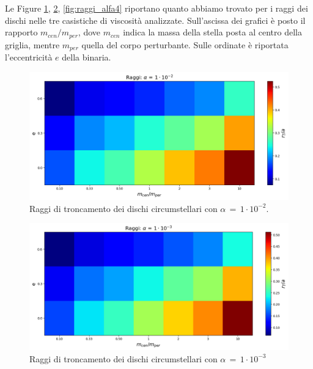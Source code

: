 Le Figure \ref{fig:raggi_alfa2}, \ref{fig:raggi_alfa3}, \ref{fig:raggi_alfa4} riportano quanto abbiamo trovato per i raggi dei dischi nelle tre casistiche di viscosità analizzate. Sull'ascissa dei grafici è posto il rapporto $m_{cen}/m_{per}$, dove $m_{cen}$ indica la massa della stella posta al centro della griglia, mentre $m_{per}$ quella del corpo perturbante. Sulle ordinate è riportata l'eccentricità $e$ della binaria. 

\begin{figure}[H]
  \centering
  \includegraphics[width=\textwidth]{Immagini/Risultati/raggi_alfa2.png}
  \caption{Raggi di troncamento dei dischi circumstellari con $\alpha\,=\,1 \cdot 10^{-2}$. }
  \label{fig:raggi_alfa2}
\end{figure}

\begin{figure}[H]
  \centering
  \includegraphics[width=\textwidth]{Immagini/Risultati/raggi_alfa3.png}
  \caption{Raggi di troncamento dei dischi circumstellari con $\alpha\,=\,1 \cdot 10^{-3}$}
  \label{fig:raggi_alfa3}
\end{figure}

